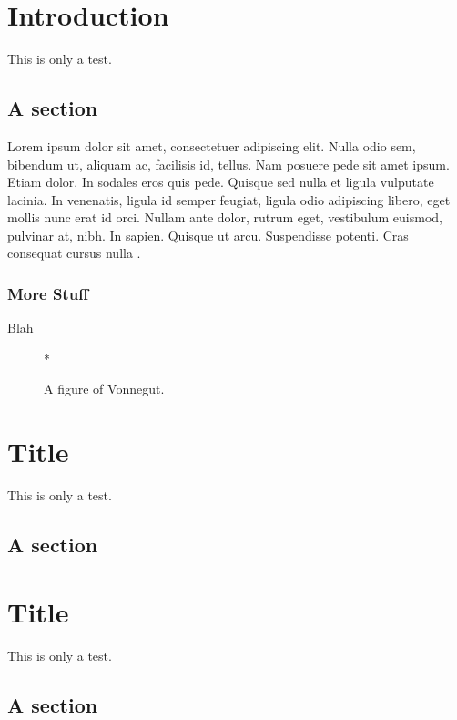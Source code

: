 \documentclass[12pt,chapterheads]{UCMerced}
\begin{document}

%   
%   
\chapter{Introduction}
This is only a test.
\section{A section}
Lorem ipsum dolor sit amet, consectetuer adipiscing elit. Nulla odio
sem, bibendum ut, aliquam ac, facilisis id, tellus. Nam posuere pede
sit amet ipsum. Etiam dolor. In sodales eros quis pede.  Quisque sed
nulla et ligula vulputate lacinia. In venenatis, ligula id semper
feugiat, ligula odio adipiscing libero, eget mollis nunc erat id orci.
Nullam ante dolor, rutrum eget, vestibulum euismod, pulvinar at, nibh.
In sapien. Quisque ut arcu. Suspendisse potenti. Cras consequat cursus
nulla \cite{Goodman}.

\subsection{More Stuff}
Blah

\begin{figure}[h] 
  \begin{center}*\end{center}
    \caption{A figure of Vonnegut.} 
\end{figure}


\chapter{Title}
This is only a test.
\section{A section}

\chapter{Title}
This is only a test.
\section{A section}
\end{document}
